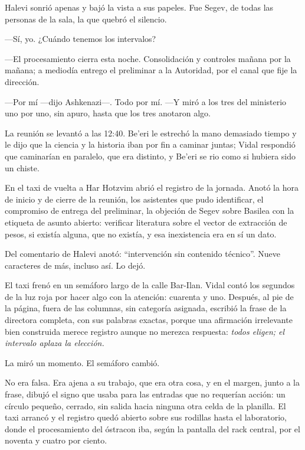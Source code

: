 Halevi sonrió apenas y bajó la vista a sus papeles. Fue Segev, de todas las personas de la sala, la que quebró el silencio.

---Sí, yo. ¿Cuándo tenemos los intervalos?

---El procesamiento cierra esta noche. Consolidación y controles mañana por la mañana; a mediodía entrego el preliminar a la Autoridad, por el canal que fije la dirección.

---Por mí ---dijo Ashkenazi---. Todo por mí. ---Y miró a los tres del ministerio uno por uno, sin apuro, hasta que los tres anotaron algo.

La reunión se levantó a las 12:40. Be'eri le estrechó la mano demasiado tiempo y le dijo que la ciencia y la historia iban por fin a caminar juntas; Vidal respondió que caminarían en paralelo, que era distinto, y Be'eri se rio como si hubiera sido un chiste.


\scenebreak


En el taxi de vuelta a Har Hotzvim abrió el registro de la jornada. Anotó la hora de inicio y de cierre de la reunión, los asistentes que pudo identificar, el compromiso de entrega del preliminar, la objeción de Segev sobre Basilea con la etiqueta de asunto abierto: verificar literatura sobre el vector de extracción de pesos, si existía alguna, que no existía, y esa inexistencia era en sí un dato.

Del comentario de Halevi anotó: ``intervención sin contenido técnico''. Nueve caracteres de más, incluso así. Lo dejó.

El taxi frenó en un semáforo largo de la calle Bar-Ilan. Vidal contó los segundos de la luz roja por hacer algo con la atención: cuarenta y uno. Después, al pie de la página, fuera de las columnas, sin categoría asignada, escribió la frase de la directora completa, con sus palabras exactas, porque una afirmación irrelevante bien construida merece registro aunque no merezca respuesta: \textit{todos eligen; el intervalo aplaza la elección.}

La miró un momento. El semáforo cambió.

No era falsa. Era ajena a su trabajo, que era otra cosa, y en el margen, junto a la frase, dibujó el signo que usaba para las entradas que no requerían acción: un círculo pequeño, cerrado, sin salida hacia ninguna otra celda de la planilla. El taxi arrancó y el registro quedó abierto sobre sus rodillas hasta el laboratorio, donde el procesamiento del óstracon iba, según la pantalla del rack central, por el noventa y cuatro por ciento.

